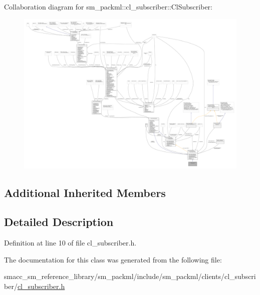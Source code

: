 Collaboration diagram for sm\+\_\+packml\+:\+:cl\+\_\+subscriber\+:\+:Cl\+Subscriber\+:
\nopagebreak
\begin{figure}[H]
\begin{center}
\leavevmode
\includegraphics[width=350pt]{classsm__packml_1_1cl__subscriber_1_1ClSubscriber__coll__graph}
\end{center}
\end{figure}
\subsection*{Additional Inherited Members}


\subsection{Detailed Description}


Definition at line 10 of file cl\+\_\+subscriber.\+h.



The documentation for this class was generated from the following file\+:\begin{DoxyCompactItemize}
\item 
smacc\+\_\+sm\+\_\+reference\+\_\+library/sm\+\_\+packml/include/sm\+\_\+packml/clients/cl\+\_\+subscriber/\hyperlink{sm__packml_2include_2sm__packml_2clients_2cl__subscriber_2cl__subscriber_8h}{cl\+\_\+subscriber.\+h}\end{DoxyCompactItemize}
